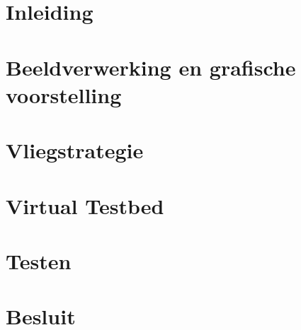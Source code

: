 \documentclass[tt]{penoverslag}
\begin{document}
\maketitlepage


\begin{abstract}



\end{abstract}


\tableofcontents\newpage

%


\rm 

\section*{Inleiding}
\label{sec:Inleiding}



\section{Beeldverwerking en grafische voorstelling}
\label{sec:Beeldverwerking}



\section{Vliegstrategie}
\label{sec:Vliegstrategie}

\label{key}





\section{Virtual Testbed}
\label{sec:Virtual Testbed}





\section{Testen}
\label{sec:Testen}


\section*{Besluit}
\label{sec:Besluit}






\end{document}
